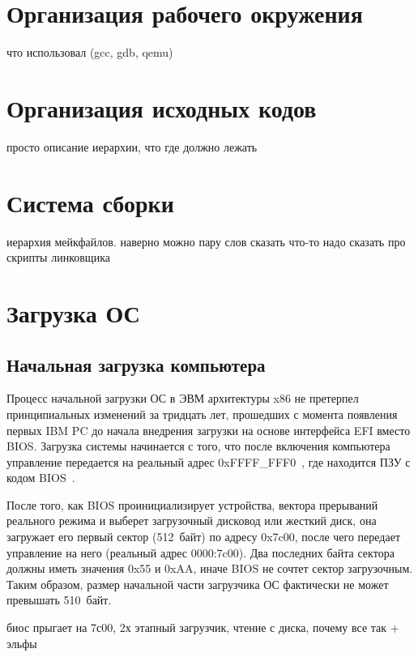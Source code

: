 

\section{Организация рабочего окружения}
что использовал (gcc, gdb, qemu)

\section{Организация исходных кодов}
просто описание иерархии, что где должно лежать

\section{Система сборки}
иерархия мейкфайлов. наверно можно пару слов сказать
что-то надо сказать про скрипты линковщика

\section{Загрузка ОС}
\subsection{Начальная загрузка компьютера}
Процесс начальной загрузки ОС в ЭВМ архитектуры x86 не претерпел
принципиальных изменений за тридцать лет, прошедших с момента появления
первых IBM PC до начала внедрения загрузки на основе интерфейса EFI вместо
BIOS. Загрузка системы начинается с того, что после включения компьютера
управление передается на реальный адрес 0xFFFF\_FFF0~\cite{amd_pm_v2}, где находится
ПЗУ с кодом BIOS~\cite{mstu_os_dev_method}.

После того, как BIOS проинициализирует устройства, вектора прерываний реального
режима и выберет загрузочный дисковод или жесткий диск, она загружает его
первый сектор (512~байт) по адресу 0x7c00, после чего передает управление на
него (реальный адрес 0000:7c00). Два последних байта сектора должны иметь
значения 0x55 и 0xAA, иначе BIOS не сочтет сектор загрузочным. Таким образом,
размер начальной части загрузчика ОС фактически не может превышать 510~байт.

биос прыгает на 7с00, 2х этапный загрузчик, чтение с диска, почему все так + эльфы

